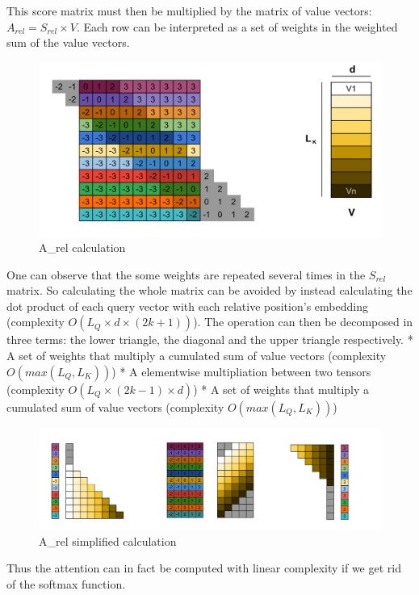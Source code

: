 This score matrix must then be multiplied by the matrix of value
vectors: \(A_{rel} = S_{rel} \times V\). Each row can be interpreted as
a set of weights in the weighted sum of the value vectors.

\begin{figure}
\centering
\includegraphics{images/S_rel_V.png}
\caption{A\_rel calculation}
\end{figure}

One can observe that the some weights are repeated several times in the
\(S_{rel}\) matrix. So calculating the whole matrix can be avoided by
instead calculating the dot product of each query vector with each
relative position's embedding (complexity
\(O \left(L_Q\times d\times(2k+1)\right)\)). The operation can then be
decomposed in three terms: the lower triangle, the diagonal and the
upper triangle respectively. * A set of weights that multiply a
cumulated sum of value vectors (complexity \(O(max(L_Q, L_K))\)) * A
elementwise multipliation between two tensors (complexity
\(O(L_Q\times (2k-1) \times d)\)) * A set of weights that multiply a
cumulated sum of value vectors (complexity \(O(max(L_Q, L_K))\))

\begin{figure}
\centering
\includegraphics{images/S_rel_V_detailed.png}
\caption{A\_rel simplified calculation}
\end{figure}

Thus the attention can in fact be computed with linear complexity if we
get rid of the softmax function.

